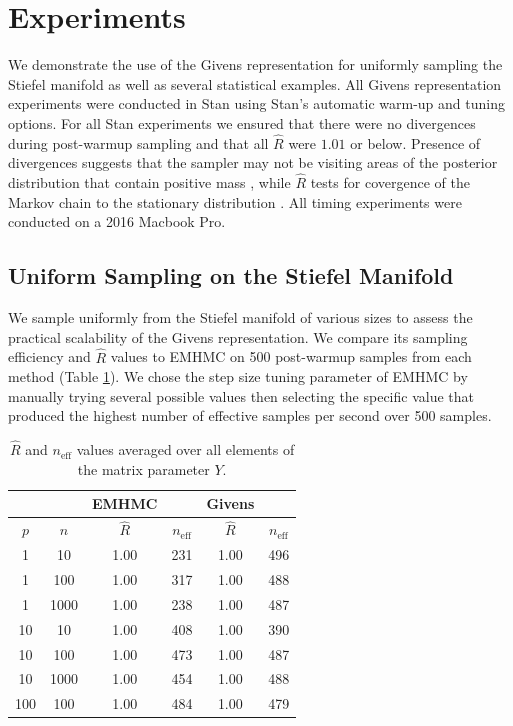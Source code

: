 \documentclass[ba]{imsart}
\numberwithin{equation}{section}
\theoremstyle{plain}
\begin{document}
\section{Experiments} \label{examples}
We demonstrate the use of the Givens representation for uniformly sampling the Stiefel manifold as well as several statistical examples. All Givens representation experiments were conducted in Stan using Stan's automatic warm-up and tuning options. For all Stan experiments we ensured that there were no divergences during post-warmup sampling and that all $\hat{R}$ were $1.01$ or below. Presence of divergences suggests that the sampler may not be visiting areas of the posterior distribution that contain positive mass \citep{betancourt2015hamiltonian}, while $\hat{R}$ tests for covergence of the Markov chain to the stationary distribution \citep{gelman1992inference}. All timing experiments were conducted on a 2016 Macbook Pro.

\subsection{Uniform Sampling on the Stiefel Manifold} \label{scaling_examples}
We sample uniformly from the Stiefel manifold of various sizes to assess the practical scalability of the Givens representation. We compare its sampling efficiency and $\hat{R}$ values to EMHMC on 500 post-warmup samples from each method (Table \ref{tab:rhat_neff}).  We chose the step size tuning parameter of EMHMC by manually trying several possible values then selecting the specific value that produced the highest number of effective samples per second over 500 samples.

\begin{table}
\begin{tabular}{|cc||cc|cc|}
\hline
& & EMHMC & & Givens &\\
\hline
$p$ & $n$  & $\hat{R}$ & $n_{\mathrm{eff}}$ & $\hat{R}$ & $n_{\mathrm{eff}}$\\
\hline
\hline
1 & 10 & 1.00 & 231 & 1.00 & 496\\
1 & 100 & 1.00 & 317 & 1.00 & 488\\
1 & 1000 & 1.00 & 238 & 1.00 & 487 \\
\hline
10 & 10 & 1.00 & 408 & 1.00  & 390\\
10 & 100 & 1.00 & 473 & 1.00 & 487\\
10 & 1000 & 1.00 & 454 & 1.00  & 488 \\
\hline
100 & 100 & 1.00 & 484 & 1.00 & 479 \\
\hline
\end{tabular}
\caption{$\hat{R}$ and $n_{\mathrm{eff}}$ values averaged over all elements of the matrix parameter $Y$. }
\label{tab:rhat_neff}
\end{table}
\end{document}
